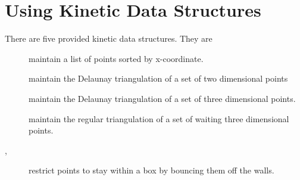 \section{Using Kinetic Data Structures\label{sec:kds_provided_kdss}}


There are five provided kinetic data structures. They are
\begin{description}
\item[] maintain a list of points
sorted by x-coordinate.
\item[] maintain the Delaunay triangulation of a set of
  two dimensional points
\item[] maintain the Delaunay triangulation of a set of
  three dimensional points.
\item[] maintain the regular triangulation of a set of waiting
three dimensional points.
\item[,
  ] restrict points to stay
  within a box by bouncing them off the walls.
\end{description}









